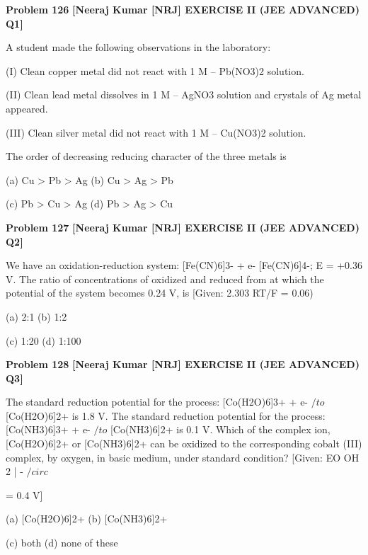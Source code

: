 \begin{problembox}
\textbf{Problem 126} \hfill \textbf{[Neeraj Kumar [NRJ] EXERCISE II (JEE ADVANCED) Q1]}
\label{q:ext-nrj_all_questions-126}

A student made the following observations in the 
laboratory:
 
    (I)  Clean copper metal did not react with 1 M -- 
Pb(NO3)2 solution.
 
   (II)  Clean lead metal dissolves in 1 M --  AgNO3 
solution and crystals of Ag metal appeared.
 
 (III)  Clean silver metal did not react with 1 M -- 
Cu(NO3)2 solution.
 
 The order of decreasing reducing character of the 
three metals is
 
 (a) Cu > Pb > Ag 
(b) Cu > Ag > Pb
 
 (c) Pb > Cu > Ag 
(d) Pb > Ag > Cu
\end{problembox}

\begin{problembox}
\textbf{Problem 127} \hfill \textbf{[Neeraj Kumar [NRJ] EXERCISE II (JEE ADVANCED) Q2]}
\label{q:ext-nrj_all_questions-127}

We 
have 
an 
oxidation-reduction 
system: 
[Fe(CN)6]3- + e-   [Fe(CN)6]4-; E  = +0.36 V. The 
ratio of concentrations of oxidized and reduced 
from at which the potential of the system becomes 
0.24 V, is [Given: 2.303 RT/F = 0.06)
 
 (a) 2:1 
(b) 1:2
 
 (c) 1:20 
(d) 1:100
\end{problembox}

\begin{problembox}
\textbf{Problem 128} \hfill \textbf{[Neeraj Kumar [NRJ] EXERCISE II (JEE ADVANCED) Q3]}
\label{q:ext-nrj_all_questions-128}

The standard reduction potential for the process: 
[Co(H2O)6]3+ + e- $/to$ [Co(H2O)6]2+ is 1.8 V. The 
standard reduction potential for the process: 
[Co(NH3)6]3+ + e- $/to$ [Co(NH3)6]2+ is 0.1 V. Which 
of the complex ion, [Co(H2O)6]2+ or [Co(NH3)6]2+ 
can be oxidized to the corresponding cobalt (III) 
complex, by oxygen, in basic medium, under 
standard condition? [Given: EO OH
2 |
-
$/circ$
 
= 0.4 V]
 
 (a) [Co(H2O)6]2+ 
(b) [Co(NH3)6]2+
 
 (c) both 
(d) none of these
\end{problembox}

